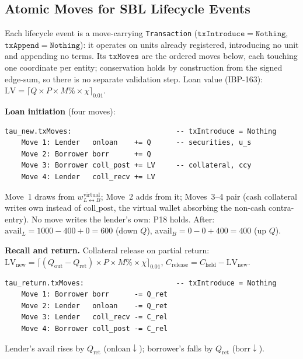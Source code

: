 \subsection{Atomic Moves for SBL Lifecycle Events}
\label{sec:sbl-moves}

Each lifecycle event is a move-carrying \texttt{Transaction} ($\mathtt{txIntroduce}=\texttt{Nothing}$, $\mathtt{txAppend}=\texttt{Nothing}$): it operates on units already registered, introducing no unit and appending no terms. Its $\mathtt{txMoves}$ are the ordered moves below, each touching one coordinate per entity; conservation holds by construction from the signed edge-sum, so there is no separate validation step. Loan value (IBP-163): $\mathrm{LV} = \lceil Q\times P\times M\%\times\chi \rceil_{0.01}$.

\noindent\textbf{Loan initiation} (four moves):
\begin{lstlisting}
tau_new.txMoves:                         -- txIntroduce = Nothing
    Move 1: Lender   onloan    += Q      -- securities, u_s
    Move 2: Borrower borr      += Q
    Move 3: Borrower coll_post += LV     -- collateral, ccy
    Move 4: Lender   coll_recv += LV
\end{lstlisting}
Move~1 draws from $w^{\mathrm{virtual}}_{L\leftrightarrow B}$; Move~2 adds from it; Moves~3--4 pair (cash collateral writes $\mathrm{own}$ instead of $\mathrm{coll\_post}$, the virtual wallet absorbing the non-cash contra-entry). No move writes the lender's $\mathrm{own}$: P18 holds. After: $\mathrm{avail}_L = 1000-400+0 = 600$ (down $Q$), $\mathrm{avail}_B = 0-0+400 = 400$ (up $Q$).

\noindent\textbf{Recall and return.} Collateral release on partial return: $\mathrm{LV}_{\mathrm{new}} = \lceil (Q_{\mathrm{out}}-Q_{\mathrm{ret}})\times P\times M\%\times\chi\rceil_{0.01}$, $C_{\mathrm{release}} = C_{\mathrm{held}}-\mathrm{LV}_{\mathrm{new}}$.
\begin{lstlisting}
tau_return.txMoves:                      -- txIntroduce = Nothing
    Move 1: Borrower borr      -= Q_ret
    Move 2: Lender   onloan    -= Q_ret
    Move 3: Lender   coll_recv -= C_rel
    Move 4: Borrower coll_post -= C_rel
\end{lstlisting}
Lender's $\mathrm{avail}$ rises by $Q_{\mathrm{ret}}$ ($\mathrm{onloan}\downarrow$); borrower's falls by $Q_{\mathrm{ret}}$ ($\mathrm{borr}\downarrow$).

